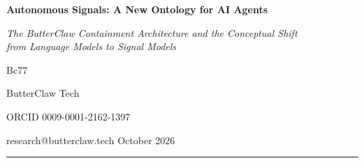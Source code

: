 \documentclass[11pt,a4paper]{article}
\begin{document}

\begin{center}
  {\LARGE\bfseries\color{navyblue}
    Autonomous Signals: A New Ontology for AI Agents}

  \vspace{8pt}
  {\large\color{slateblue}\itshape
    The ButterClaw Containment Architecture and the Conceptual Shift\\
    from Language Models to Signal Models}

  \vspace{6pt}
  {\normalsize Bc77}

  \vspace{3pt}
  {\footnotesize ButterClaw Tech}

  \vspace{1pt}
  {\footnotesize ORCID 0009-0001-2162-1397}

  \vspace{2pt}
  {\small\color{gray} research@butterclaw.tech \quad\textbullet\quad October 2026}
\end{center}

\vspace{4pt}\noindent\rule{\linewidth}{1.5pt}\vspace{2pt}
\end{document}
